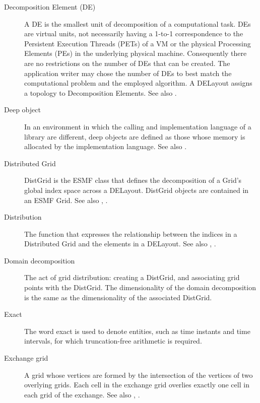 \begin{description}
\label{glos:Decomp_Element}
\item[Decomposition Element (DE)]
  A DE is the smallest unit of decomposition of a
  computational task.  DEs are virtual units, not necessarily having 
  a 1-to-1 correspondence to the Persistent Execution Threads (PETs)
  of a VM or the physical Processing Elements (PEs) in the underlying
  physical machine. Consequently there are no restrictions on the 
  number of DEs that can be created. The application writer may chose
  the number of DEs to best match the computational problem and the
  employed algorithm.  A DELayout assigns a topology to
  Decomposition Elements.
  See also .

\label{glos:DeepObjects}
\item[Deep object] In an environment
  in which the calling and implementation language of a library are
  different, deep objects are defined as those whose memory is 
  allocated by the implementation language. 
  See also . 

\label{glos:DistGrid}
\item[Distributed Grid]
  DistGrid is the ESMF class that defines the 
  decomposition of a Grid's global index space across a DELayout.
  DistGrid objects are contained in an ESMF Grid. 
  See also , .

\label{glos:Distribution}
\item[Distribution] The function that expresses
  the relationship between the indices in a Distributed Grid and the elements 
  in a DELayout. See also , 
  . 

\label{glos:DomainDecomp}
\item[Domain decomposition] The act of grid 
  distribution: creating a DistGrid, and associating grid points with 
  the DistGrid.  The dimensionality of the domain decomposition is the 
  same as the dimensionality of the associated DistGrid.

\label{glos:Exact}
\item [Exact] The word exact is used
  to denote entities, such as time instants and time intervals, for 
  which truncation-free arithmetic is required. 

\label{glos:ExchangeGrid}
\item[Exchange grid] A grid whose vertices are
  formed by the intersection of the vertices of two overlying grids.  Each 
  cell in the exchange grid overlies exactly one cell in each grid of the 
  exchange. See also , .


\end{description}
